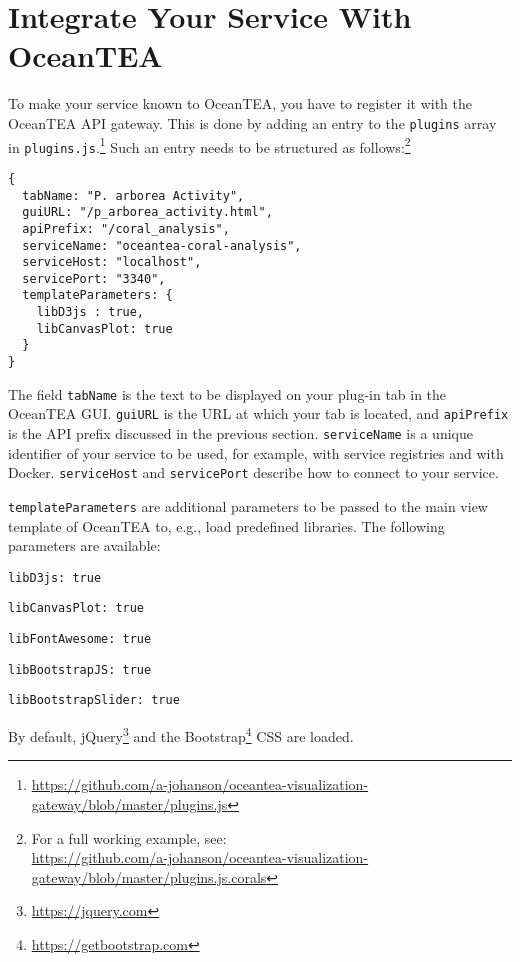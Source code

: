 \documentclass[11pt,a4paper,english,oneside,parskip=false]{scrartcl} %
\begin{document}
\section{Integrate Your Service With OceanTEA} \label{sec:git}

To make your service known to OceanTEA, you have to register it with the OceanTEA API gateway. 
This is done by adding an entry to the \texttt{plugins} array in \texttt{plugins.js}.\footnote{\url{https://github.com/a-johanson/oceantea-visualization-gateway/blob/master/plugins.js}} 
Such an entry needs to be structured as follows:\footnote{For a full working example, see:\\ \url{https://github.com/a-johanson/oceantea-visualization-gateway/blob/master/plugins.js.corals}} 
\begin{verbatim}
{
  tabName: "P. arborea Activity",
  guiURL: "/p_arborea_activity.html",
  apiPrefix: "/coral_analysis",
  serviceName: "oceantea-coral-analysis",
  serviceHost: "localhost",
  servicePort: "3340",
  templateParameters: {
    libD3js : true,
    libCanvasPlot: true
  }
}
\end{verbatim}

The field \texttt{tabName} is the text to be displayed on your plug\hyp{}in tab in the OceanTEA GUI. 
\texttt{guiURL} is the URL at which your tab is located, and \texttt{apiPrefix} is the API prefix discussed in the previous section. 
\texttt{serviceName} is a unique identifier of your service to be used, for example, with service registries and with Docker. 
\texttt{serviceHost} and \texttt{servicePort} describe how to connect to your service. 

\texttt{templateParameters} are additional parameters to be passed to the main view template of OceanTEA to, e.g., load predefined libraries. 
The following parameters are available:
\begin{compactitemize}
	\item \texttt{libD3js: true}
	\item \texttt{libCanvasPlot: true}
	\item \texttt{libFontAwesome: true}
	\item \texttt{libBootstrapJS: true}
	\item \texttt{libBootstrapSlider: true}
\end{compactitemize}
By default, jQuery\footnote{\url{https://jquery.com}} and the Bootstrap\footnote{\url{https://getbootstrap.com}} CSS are loaded. 
\end{document}
